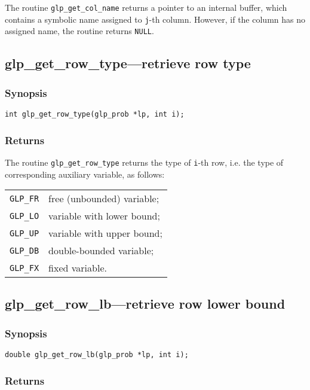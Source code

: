 The routine \verb|glp_get_col_name| returns a pointer to an internal
buffer, which contains a symbolic name assigned to \verb|j|-th column.
However, if the column has no assigned name, the routine returns
\verb|NULL|.

\subsection{glp\_get\_row\_type---retrieve row type}

\subsubsection*{Synopsis}

\begin{verbatim}
int glp_get_row_type(glp_prob *lp, int i);
\end{verbatim}

\subsubsection*{Returns}

The routine \verb|glp_get_row_type| returns the type of \verb|i|-th
row, i.e. the type of corresponding auxiliary variable, as follows:

\begin{tabular}{@{}ll}
\verb|GLP_FR| & free (unbounded) variable; \\
\verb|GLP_LO| & variable with lower bound; \\
\verb|GLP_UP| & variable with upper bound; \\
\verb|GLP_DB| & double-bounded variable; \\
\verb|GLP_FX| & fixed variable. \\
\end{tabular}

\subsection{glp\_get\_row\_lb---retrieve row lower bound}

\subsubsection*{Synopsis}

\begin{verbatim}
double glp_get_row_lb(glp_prob *lp, int i);
\end{verbatim}

\subsubsection*{Returns}

